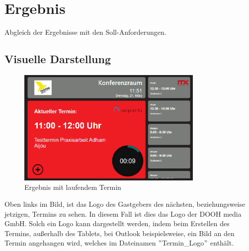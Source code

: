 
\newpage
\section{Ergebnis}\label{sec:ergebnis}
Abgleich der Ergebnisse mit den Soll-Anforderungen.
\subsection{Visuelle Darstellung}\label{subsec:visuelle-darstellung}
\begin{figure}[h]
    \centering
    \includegraphics[width=0.8\textwidth]{Bilder/Ergebnis_LaufenderTermin}
    \caption{Ergebnis mit laufendem Termin}
    \label{fig:Ergebnis mit laufendem Termin}
\par\vspace{1cm}
\end{figure}
\justifying
\newline
Oben links im Bild, ist das Logo des Gastgebers des nächsten, beziehungsweise jetzigen, Termins zu sehen.
In diesem Fall ist dies das Logo der DOOH media GmbH\@.
Solch ein Logo kann dargestellt werden, indem beim Erstellen des Termins, außerhalb des Tablets, bei Outlook beispielsweise, ein Bild an den Termin angehangen wird, welches im Dateinamen \("\)Termin\_Logo\("\) enthält.
